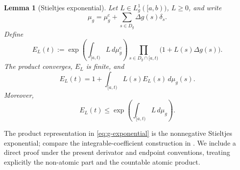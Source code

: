 \documentclass[preprint,12pt]{elsarticle}
\newenvironment{revision}{\begingroup\color{red}}{\endgroup}
\newenvironment{revision}{}{}
\newenvironment{finalrevision}{\begingroup\color{red}}{\endgroup}
\newenvironment{finalrevision}{}{}
\newtheorem{lemma}[theorem]{Lemma}
\theoremstyle{definition}
\theoremstyle{remark}
\begin{document}
\begin{lemma}[Stieltjes exponential]\label{lem:g-exponential}
Let $L\in L_g^1([a,b))$, $L\ge0$, and write
\[
 \mu_g=\mu_g^{\mathrm c}+\sum_{s\in D_g}\Delta g(s)\delta_s.
\]
Define
\begin{equation}\label{eq:g-exponential}
 E_L(t):=
 \exp\left(\int_{[a,t)}L\,d\mu_g^{\mathrm c}\right)
 \prod_{s\in D_g\cap[a,t)}\bigl(1+L(s)\Delta g(s)\bigr).
\end{equation}
The product converges, $E_L$ is finite, and
\begin{equation}\label{eq:g-exp-integral}
 E_L(t)=1+\int_{[a,t)}L(s)E_L(s)\,d\mu_g(s).
\end{equation}
Moreover,
\begin{equation}\label{eq:g-exp-upper}
 E_L(t)\le \exp\left(\int_{[a,t)}L\,d\mu_g\right).
\end{equation}
\end{lemma}

\begin{revision}
\begin{finalrevision}
The product representation in \eqref{eq:g-exponential} is the nonnegative
Stieltjes exponential; compare the integrable-coefficient construction in
\cite{FerMarToj22}. We include a direct proof under the present derivator and
endpoint conventions, treating explicitly the non-atomic part and the
countable atomic product.
\end{finalrevision}
\end{revision}
\end{document}
